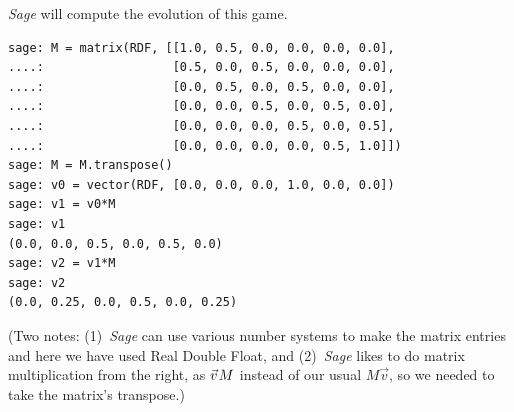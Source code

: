 \textit{Sage} will compute the evolution of this game. 
\begin{lstlisting}
sage: M = matrix(RDF, [[1.0, 0.5, 0.0, 0.0, 0.0, 0.0],
....:                  [0.5, 0.0, 0.5, 0.0, 0.0, 0.0],
....:                  [0.0, 0.5, 0.0, 0.5, 0.0, 0.0],
....:                  [0.0, 0.0, 0.5, 0.0, 0.5, 0.0],
....:                  [0.0, 0.0, 0.0, 0.5, 0.0, 0.5],
....:                  [0.0, 0.0, 0.0, 0.0, 0.5, 1.0]])
sage: M = M.transpose()
sage: v0 = vector(RDF, [0.0, 0.0, 0.0, 1.0, 0.0, 0.0])
sage: v1 = v0*M
sage: v1
(0.0, 0.0, 0.5, 0.0, 0.5, 0.0)
sage: v2 = v1*M
sage: v2
(0.0, 0.25, 0.0, 0.5, 0.0, 0.25)  
\end{lstlisting}
(Two notes: (1)~\textit{Sage} can use various number systems to 
make the matrix entries and here we have used Real Double Float, and 
(2)~\textit{Sage} likes to do matrix multiplication from the right, 
as $\vec{v}\hspace{.1em}M$ instead of our usual $M\vec{v}$, 
so we needed to take the matrix's transpose.)

